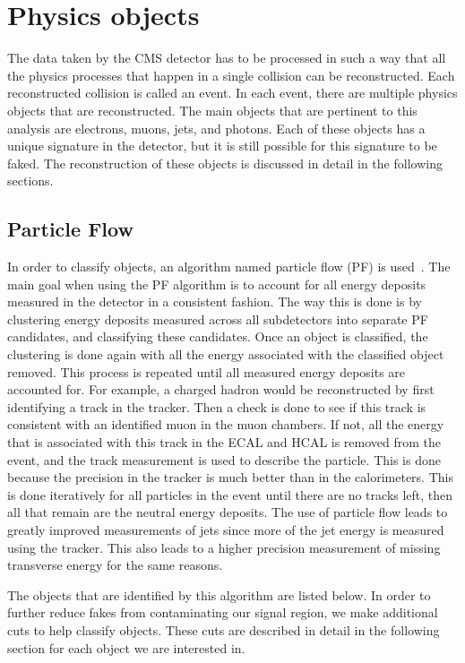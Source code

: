 \section{Physics objects}
The data taken by the CMS detector has to be processed in such a way that all the physics processes that happen in a single collision can be reconstructed.
Each reconstructed collision is called an event.
In each event, there are multiple physics objects that are reconstructed.
The main objects that are pertinent to this analysis are electrons, muons, jets, and photons.
Each of these objects has a unique signature in the detector, but it is still possible for this signature to be faked.
The reconstruction of these objects is discussed in detail in the following sections.

\subsection{Particle Flow}
\label{subs:particleflow}
In order to classify objects, an algorithm named particle flow (PF) is used~\cite{pfReco}. 
The main goal when using the PF algorithm is to account for all energy deposits measured in the detector in a consistent fashion.
The way this is done is by clustering energy deposits measured across all subdetectors into separate PF candidates, and classifying these candidates.
Once an object is classified, the clustering is done again with all the energy associated with the classified object removed.
This process is repeated until all measured energy deposits are accounted for.
For example, a charged hadron would be reconstructed by first identifying a track in the tracker.
Then a check is done to see if this track is consistent with an identified muon in the muon chambers.
If not, all the energy that is associated with this track in the ECAL and HCAL is removed from the event,
and the track measurement is used to describe the particle.
This is done because the precision in the tracker is much better than in the calorimeters.
This is done iteratively for all particles in the event until there are no tracks left,
then all that remain are the neutral energy deposits.
The use of particle flow leads to greatly improved measurements of jets since more of the jet energy is measured using the tracker.
This also leads to a higher precision measurement of missing transverse energy for the same reasons.

The objects that are identified by this algorithm are listed below.
In order to further reduce fakes from contaminating our signal region, we make additional cuts to help classify objects.
These cuts are described in detail in the following section for each object we are interested in.

